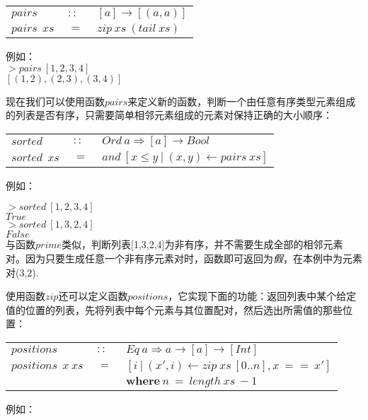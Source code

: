 \begin{tabular}[t]{lll}
  $pairs$&$~::~$&$[a] \rightarrow [(a,a)]$\\
  $pairs~~xs$&$~=~$&$zip~xs~(tail~xs)$
\end{tabular}

\noindent 例如：\\
\noindent\hspace*{1cm}$>pairs~[1,2,3,4]$\\
\hspace*{1cm}$[(1,2),(2,3),(3,4)]$

现在我们可以使用函数$pairs$来定义新的函数，判断一个由任意有序类型元素组成的列表是否有序，只需要简单相邻元素组成的元素对保持正确的大小顺序：\\

\begin{tabular}[t]{lll}
  $sorted$&$~::~$&$Ord~a \Rightarrow [a]\rightarrow Bool$\\
  $sorted~~xs$&$~=~$&$and~[x\leq y~|~(x,y) \leftarrow pairs~xs] $\\
\end{tabular}

\noindent 例如：

\noindent\hspace*{1cm}$>sorted~[1,2,3,4]$\\
\hspace*{1cm}$True$\\

\noindent\hspace*{1cm}$>sorted~[1,3,2,4]$\\
\hspace*{1cm}$False$\\

与函数$prime$类似，判断列表[1,3,2,4]为非有序，并不需要生成全部的相邻元素对。因为只要生成任意一个非有序元素对时，函数即可返回为\textit{假}，在本例中为元素对(3,2).

使用函数$zip$还可以定义函数$positions$，它实现下面的功能：返回列表中某个给定值的位置的列表，先将列表中每个元素与其位置配对，然后选出所需值的那些位置：

\begin{tabular}[t]{lll}
  $positions$&$~::~$&$Eq~a\Rightarrow a \rightarrow [a] \rightarrow [Int]$\\
  $positions~~x~xs$&$~=~$&$[i~|~(x', i) \leftarrow zip~xs~[0..n], x~==~x']$\\
  &&$\textbf{where}~n~=~length~xs~-1$
\end{tabular}

\noindent 例如：

